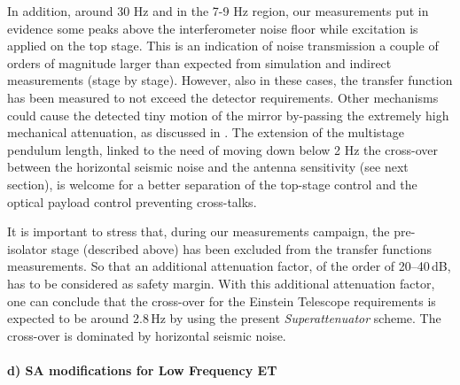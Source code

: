 In addition, around 30 Hz and in the 7-9 Hz region, our measurements put in evidence some peaks above the interferometer noise floor while excitation is applied on the top stage. This is an indication of noise transmission a couple of orders of magnitude larger than expected from simulation and indirect measurements (stage by stage). However, also in these cases, the transfer function has been measured to not exceed the detector requirements. Other mechanisms could cause the detected tiny motion of the mirror by-passing the extremely high mechanical attenuation, as discussed in \cite{Collaboration2010, Braccini2010March1-3}. The extension of the multistage pendulum length, linked to the need of moving down below 2 Hz the cross-over between the horizontal seismic noise and the antenna sensitivity (see next section), is welcome for a better separation of the top-stage control and the optical payload control preventing cross-talks.

It is important to stress that, during our measurements campaign, the pre-isolator stage (described above) has been excluded from the transfer functions measurements. So that an additional attenuation factor, of the order of 20--40\,dB, has to be considered as safety margin. With this additional attenuation factor, one can conclude that the cross-over for the Einstein Telescope requirements is expected to be around 2.8\,Hz by using the present \emph{Superattenuator} scheme. The cross-over is dominated by horizontal seismic noise.


\paragraph{d) SA modifications for Low Frequency ET}

